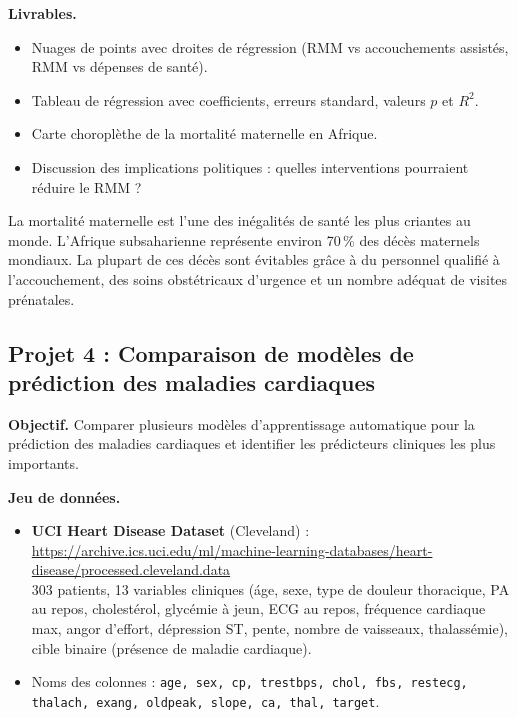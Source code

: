 \textbf{Livrables.}
\begin{itemize}
  \item Nuages de points avec droites de r\'egression (RMM vs accouchements assist\'es, RMM vs d\'epenses de sant\'e).
  \item Tableau de r\'egression avec coefficients, erreurs standard, valeurs $p$ et $R^2$.
  \item Carte choropl\`ethe de la mortalit\'e maternelle en Afrique.
  \item Discussion des implications politiques : quelles interventions pourraient r\'eduire le RMM ?
\end{itemize}

\begin{clinicalnote}
La mortalit\'e maternelle est l'une des in\'egalit\'es de sant\'e les plus criantes au monde. L'Afrique subsaharienne repr\'esente environ 70\,\% des d\'ec\`es maternels mondiaux. La plupart de ces d\'ec\`es sont \'evitables gr\^ace \`a du personnel qualifi\'e \`a l'accouchement, des soins obst\'etricaux d'urgence et un nombre ad\'equat de visites pr\'enatales.
\end{clinicalnote}

\subsection{Projet 4 : Comparaison de mod\`eles de pr\'ediction des maladies cardiaques}

\textbf{Objectif.} Comparer plusieurs mod\`eles d'apprentissage automatique pour la pr\'ediction des maladies cardiaques et identifier les pr\'edicteurs cliniques les plus importants.

\textbf{Jeu de donn\'ees.}
\begin{itemize}
  \item \textbf{UCI Heart Disease Dataset} (Cleveland) :\\
  \url{https://archive.ics.uci.edu/ml/machine-learning-databases/heart-disease/processed.cleveland.data}\\
  303 patients, 13 variables cliniques (\'age, sexe, type de douleur thoracique, PA au repos, cholest\'erol, glyc\'emie \`a jeun, ECG au repos, fr\'equence cardiaque max, angor d'effort, d\'epression ST, pente, nombre de vaisseaux, thalass\'emie), cible binaire (pr\'esence de maladie cardiaque).
  \item Noms des colonnes : \texttt{age, sex, cp, trestbps, chol, fbs, restecg, thalach, exang, oldpeak, slope, ca, thal, target}.
\end{itemize}

